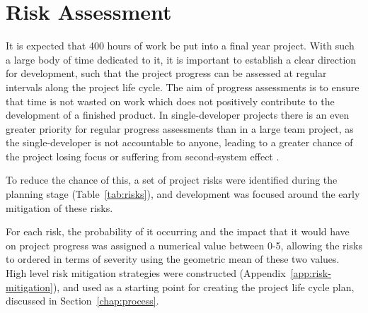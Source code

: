 \chapter{Risk Assessment}\label{chap:risks}

It is expected that 400 hours of work be put into a final year
project. With such a large body of time dedicated to it, it is
important to establish a clear direction for development, such that
the project progress can be assessed at regular intervals along the
project life cycle. The aim of progress assessments is to ensure that
time is not wasted on work which does not positively contribute to the
development of a finished product. In single-developer projects there
is an even greater priority for regular progress assessments than in a
large team project, as the single-developer is not accountable to
anyone, leading to a greater chance of the project losing focus or
suffering from second-system effect \cite{brooks1995mythical}.

To reduce the chance of this, a set of project risks were identified
during the planning stage (Table~\ref{tab:risks}), and development was
focused around the early mitigation of these risks.

For each risk, the probability of it occurring and the impact that it
would have on project progress was assigned a numerical value between
0-5, allowing the risks to ordered in terms of severity using the
geometric mean of these two values. High level risk mitigation
strategies were constructed (Appendix~\ref{app:risk-mitigation}), and
used as a starting point for creating the project life cycle plan,
discussed in Section~\ref{chap:process}.


